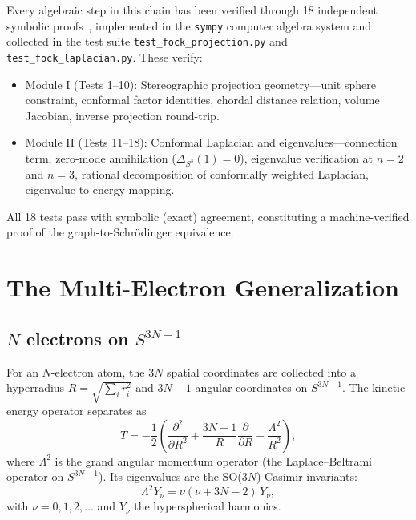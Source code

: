 \documentclass[aps,pra,twocolumn,superscriptaddress,longbibliography]{revtex4-2}
\begin{document}
Every algebraic step in this chain has been verified through 18
independent symbolic proofs~\cite{Paper7}, implemented in the
\texttt{sympy} computer algebra system and collected in the test suite
\texttt{test\_fock\_projection.py} and \texttt{test\_fock\_laplacian.py}.
These verify:
\begin{itemize}
\item Module I (Tests 1--10): Stereographic projection geometry---unit
  sphere constraint, conformal factor identities, chordal distance
  relation, volume Jacobian, inverse projection round-trip.
\item Module II (Tests 11--18): Conformal Laplacian and
  eigenvalues---connection term, zero-mode annihilation
  ($\Delta_{S^3}(1) = 0$), eigenvalue verification at $n = 2$ and
  $n = 3$, rational decomposition of conformally weighted Laplacian,
  eigenvalue-to-energy mapping.
\end{itemize}
All 18 tests pass with symbolic (exact) agreement, constituting a
machine-verified proof of the graph-to-Schr\"odinger equivalence.


\section{The Multi-Electron Generalization}
\label{sec:multielectron}

\subsection{$N$ electrons on $S^{3N-1}$}

For an $N$-electron atom, the $3N$ spatial coordinates are collected
into a hyperradius $R = \sqrt{\sum_i r_i^2}$ and $3N-1$ angular
coordinates on $S^{3N-1}$.  The kinetic energy operator separates as
\begin{equation}
T = -\frac{1}{2}\left(\frac{\partial^2}{\partial R^2}
+ \frac{3N-1}{R}\frac{\partial}{\partial R}
- \frac{\Lambda^2}{R^2}\right),
\label{eq:kinetic_N}
\end{equation}
where $\Lambda^2$ is the grand angular momentum operator (the
Laplace--Beltrami operator on $S^{3N-1}$).  Its eigenvalues are the
SO($3N$) Casimir invariants:
\begin{equation}
\Lambda^2 Y_\nu = \nu(\nu + 3N - 2)\, Y_\nu,
\label{eq:casimir_3N}
\end{equation}
with $\nu = 0, 1, 2, \ldots$ and $Y_\nu$ the hyperspherical harmonics.
\end{document}
